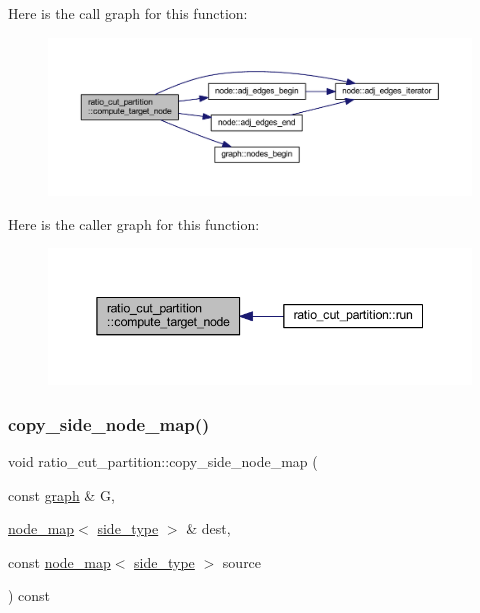 Here is the call graph for this function\+:\nopagebreak
\begin{figure}[H]
\begin{center}
\leavevmode
\includegraphics[width=350pt]{classratio__cut__partition_ae9a09532c706835e47ee4f02c24c82af_cgraph}
\end{center}
\end{figure}
Here is the caller graph for this function\+:\nopagebreak
\begin{figure}[H]
\begin{center}
\leavevmode
\includegraphics[width=345pt]{classratio__cut__partition_ae9a09532c706835e47ee4f02c24c82af_icgraph}
\end{center}
\end{figure}
\mbox{\label{classratio__cut__partition_a8662bd1471d93d270de1c99d32ff3534}} 
\subsubsection{\texorpdfstring{copy\+\_\+side\+\_\+node\+\_\+map()}{copy\_side\_node\_map()}}
{\footnotesize\ttfamily void ratio\+\_\+cut\+\_\+partition\+::copy\+\_\+side\+\_\+node\+\_\+map (\begin{DoxyParamCaption}\item[{const \mbox{\hyperlink{classgraph}{graph}} \&}]{G,  }\item[{\mbox{\hyperlink{classnode__map}{node\+\_\+map}}$<$ \mbox{\hyperlink{classratio__cut__partition_ace53442bd0c1e21fbf00858ec6f6b456}{side\+\_\+type}} $>$ \&}]{dest,  }\item[{const \mbox{\hyperlink{classnode__map}{node\+\_\+map}}$<$ \mbox{\hyperlink{classratio__cut__partition_ace53442bd0c1e21fbf00858ec6f6b456}{side\+\_\+type}} $>$}]{source }\end{DoxyParamCaption}) const\hspace{0.3cm}{\ttfamily [protected]}}



